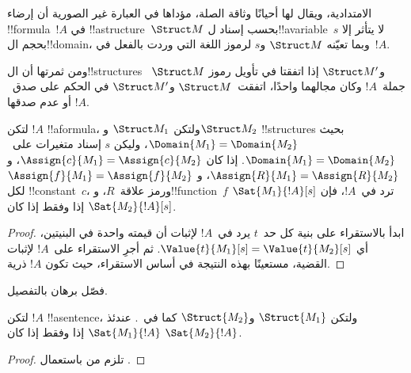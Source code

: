\documentclass[../../../include/open-logic-section]{subfiles}
\begin{document}


\begin{explain}
الامتدادية، ويقال لها أحيانًا وثاقة الصلة، مؤداها في العبارة غير
الصورية أن إرضاء !!{formula}~$!A$ في
!!a{structure}~$\Struct M$ بحسب إسناد ل!!a{variable}~$s$
لا يتأثر إلا بحجم ال!!{domain}، وبما تعيّنه
$\Struct M$ و$s$ لرموز اللغة التي وردت بالفعل في~$!A$.

ومن ثمرتها أن ال!!{structure}s
~$\Struct M$ و$\Struct M'$ إذا اتفقتا في تأويل رموز جملة~$!A$
وكان مجالهما واحدًا، اتفقت~$\Struct M$
و$\Struct M'$ في الحكم على صدق~$!A$ أو عدم صدقها.
\end{explain}

\begin{prop}[الامتدادية]
  لتكن $!A$ !!a{formula}، ولتكن $\Struct M_1$ و$\Struct M_2$
  !!{structure}s بحيث $\Domain{M_1} = \Domain{M_2}$، وليكن $s$
  إسناد متغيرات على~$\Domain{M_1} = \Domain{M_2}$. إذا كان
  $\Assign{c}{M_1} = \Assign{c}{M_2}$،
  و$\Assign{R}{M_1}=\Assign{R}{M_2}$، و
  $\Assign{f}{M_1} = \Assign{f}{M_2}$ لكل !!{constant}~$c$،
  ورمز علاقة~$R$، و!!{function}~$f$ ترد في~$!A$، فإن
  $\Sat{M_1}{!A}[s]$ إذا وفقط إذا كان $\Sat{M_2}{!A}[s]$.
\end{prop}

\begin{proof}
  ابدأ بالاستقراء على بنية كل حد~$t$ يرد في~$!A$ لإثبات أن قيمته
  واحدة في البنيتين، أي $\Value{t}{M_1}[s] = \Value{t}{M_2}[s]$. ثم أجرِ الاستقراء
  على~$!A$ لإثبات القضية، مستعينًا بهذه النتيجة في أساس الاستقراء،
  حيث تكون $!A$ ذرية.
\end{proof}

\begin{prob}
فصّل برهان  بالتفصيل.
\end{prob}

\begin{cor}
  لتكن $!A$ !!a{sentence}، ولتكن $\Struct{M_1}$ و$\Struct{M_2}$ كما
  في~. عندئذ
  $\Sat{M_1}{!A}$ إذا وفقط إذا كان $\Sat{M_2}{!A}$.
\end{cor}

\begin{proof}
تلزم من  باستعمال
.
\end{proof}
\end{document}
